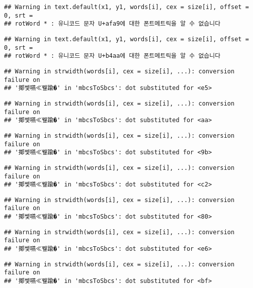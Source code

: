 \documentclass[]{article}
\begin{document}
\begin{verbatim}
## Warning in text.default(x1, y1, words[i], cex = size[i], offset = 0, srt =
## rotWord * : 유니코드 문자 U+afa9에 대한 폰트메트릭을 알 수 없습니다
\end{verbatim}

\begin{verbatim}
## Warning in text.default(x1, y1, words[i], cex = size[i], offset = 0, srt =
## rotWord * : 유니코드 문자 U+b4aa에 대한 폰트메트릭을 알 수 없습니다
\end{verbatim}

\begin{verbatim}
## Warning in strwidth(words[i], cex = size[i], ...): conversion failure on
## '揶쎛嚥≪뮆踰�' in 'mbcsToSbcs': dot substituted for <e5>
\end{verbatim}

\begin{verbatim}
## Warning in strwidth(words[i], cex = size[i], ...): conversion failure on
## '揶쎛嚥≪뮆踰�' in 'mbcsToSbcs': dot substituted for <aa>
\end{verbatim}

\begin{verbatim}
## Warning in strwidth(words[i], cex = size[i], ...): conversion failure on
## '揶쎛嚥≪뮆踰�' in 'mbcsToSbcs': dot substituted for <9b>
\end{verbatim}

\begin{verbatim}
## Warning in strwidth(words[i], cex = size[i], ...): conversion failure on
## '揶쎛嚥≪뮆踰�' in 'mbcsToSbcs': dot substituted for <c2>
\end{verbatim}

\begin{verbatim}
## Warning in strwidth(words[i], cex = size[i], ...): conversion failure on
## '揶쎛嚥≪뮆踰�' in 'mbcsToSbcs': dot substituted for <80>
\end{verbatim}

\begin{verbatim}
## Warning in strwidth(words[i], cex = size[i], ...): conversion failure on
## '揶쎛嚥≪뮆踰�' in 'mbcsToSbcs': dot substituted for <e6>
\end{verbatim}

\begin{verbatim}
## Warning in strwidth(words[i], cex = size[i], ...): conversion failure on
## '揶쎛嚥≪뮆踰�' in 'mbcsToSbcs': dot substituted for <bf>
\end{verbatim}
\end{document}
